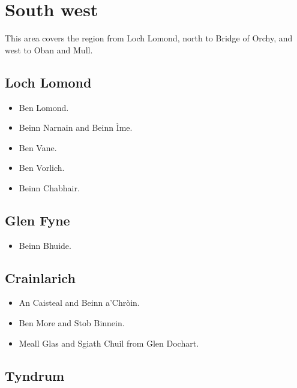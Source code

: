 \section{South west}

This area covers the region from Loch Lomond, north to Bridge of Orchy, and
west to Oban and Mull.  

\subsection{Loch Lomond}

\begin{itemize}
\item Ben Lomond.

\item Beinn Narnain and Beinn Ìme.

\item Ben Vane.

\item Ben Vorlich.

\item Beinn Chabhair.
\end{itemize}


\subsection{Glen Fyne}

\begin{itemize}
\item Beinn Bhuide.
\end{itemize}


\subsection{Crainlarich}

\begin{itemize}
\item An Caisteal and Beinn a'Chròin.

\item Ben More and Stob Binnein.

\item Meall Glas and Sgiath Chuil from Glen Dochart.
\end{itemize}


\subsection{Tyndrum}

